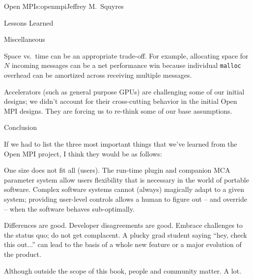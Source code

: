 \begin{aosachapter}{Open MPI}{s:openmpi}{Jeffrey M.\ Squyres}
\begin{aosasect1}{Lessons Learned}
\begin{aosasect2}{Miscellaneous}
\begin{aosaitemize}
\item Space vs.\ time can be an appropriate trade-off.  For example,
  allocating space for $N$ incoming messages can be a net performance
  win because individual {\tt malloc} overhead can be amortized across
  receiving multiple messages.

\item Accelerators (such as general purpose GPUs) are challenging some
  of our initial designs; we didn't account for their cross-cutting
  behavior in the initial Open MPI designs.  They are forcing us to
  re-think some of our base assumptions.

\end{aosaitemize}

\end{aosasect2}


\begin{aosasect2}{Conclusion}

If we had to list the three most important things that we've learned
from the Open MPI project, I think they would be as follows:

\begin{aosaitemize}
\item One size does not fit all (users).  The run-time plugin and
  companion MCA parameter system allow users flexibility that is
  necessary in the world of portable software.  Complex software
  systems cannot (always) magically adapt to a given system; providing
  user-level controls allows a human to figure out -- and override --
  when the software behaves sub-optimally.

\item Differences are good.  Developer disagreements are good.
  Embrace challenges to the status quo; do not get complacent.  A
  plucky grad student saying ``hey, check this out...'' can lead to
  the basis of a whole new feature or a major evolution of the
  product.

\item Although outside the scope of this book, people and community
  matter.  A lot.
\end{aosaitemize}

\end{aosasect2}

\end{aosasect1}

\end{aosachapter}

